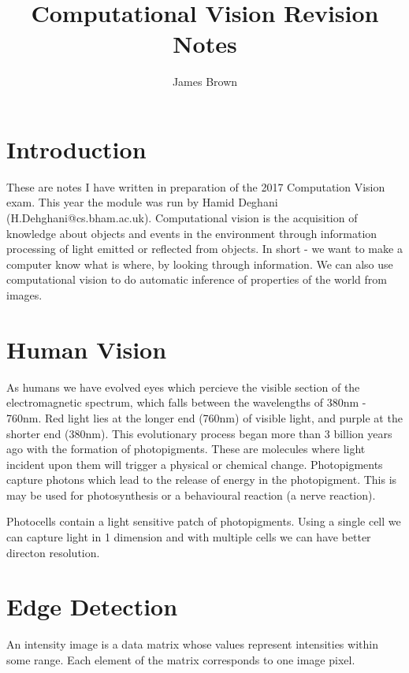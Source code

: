 \documentclass{article}
\title{Computational Vision \linebreak Revision Notes}
\author{James Brown}
\begin{document}
	\maketitle
	\newpage
	\tableofcontents
	\newpage

	\section{Introduction}
	These are notes I have written in preparation of the 2017 Computation Vision exam. This year the module was run by Hamid Deghani (H.Dehghani@cs.bham.ac.uk).
	\linebreak \linebreak
	Computational vision is the acquisition of knowledge about objects and events in the environment through information processing of light emitted or reflected from objects. In short - we want to make a computer know what is where, by looking through information. We can also use computational vision to do automatic inference of properties of the world from images.

	\section{Human Vision}
	\par
	As humans we have evolved eyes which percieve the visible section of the electromagnetic spectrum, which falls between the wavelengths of 380nm - 760nm. Red light lies at the longer end (760nm) of visible light, and purple at the shorter end (380nm). This evolutionary process began more than 3 billion years ago with the formation of photopigments. These are molecules where light incident upon them will trigger a physical or chemical change. Photopigments capture photons which lead to the release of energy in the photopigment. This is may be used for photosynthesis or a behavioural reaction (a nerve reaction).

	\par
	Photocells contain a light sensitive patch of photopigments. Using a single cell we can capture light in 1 dimension and with multiple cells we can have better directon resolution.

	\section{Edge Detection}
	An intensity image is a data matrix whose values represent intensities within some range. Each element of the matrix corresponds to one image pixel.
\end{document}
